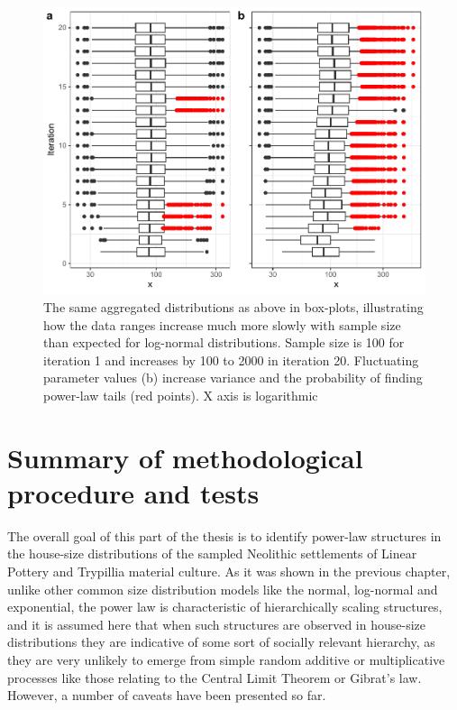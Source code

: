 \documentclass[
  12pt,
]{book}
\begin{document}
\begin{figure}

{\centering \includegraphics[width=0.9\linewidth]{bookdown-demo_files/figure-latex/05-multi-ln-box-1} 

}

\caption{The same aggregated distributions as above in box-plots, illustrating how the data ranges increase much more slowly with sample size than expected for log-normal distributions. Sample size is 100 for iteration 1 and increases by 100 to 2000 in iteration 20. Fluctuating parameter values (b) increase variance and the probability of finding power-law tails (red points). X axis is logarithmic}\label{fig:05-multi-ln-box}
\end{figure}

\FloatBarrier

\hypertarget{summary-of-methodological-procedure-and-tests}{%
\section{Summary of methodological procedure and tests}\label{summary-of-methodological-procedure-and-tests}}

The overall goal of this part of the thesis is to identify power-law structures in the house-size distributions of the sampled Neolithic settlements of Linear Pottery and Trypillia material culture. As it was shown in the previous chapter, unlike other common size distribution models like the normal, log-normal and exponential, the power law is characteristic of hierarchically scaling structures, and it is assumed here that when such structures are observed in house-size distributions they are indicative of some sort of socially relevant hierarchy, as they are very unlikely to emerge from simple random additive or multiplicative processes like those relating to the Central Limit Theorem or Gibrat's law. However, a number of caveats have been presented so far.
\end{document}
